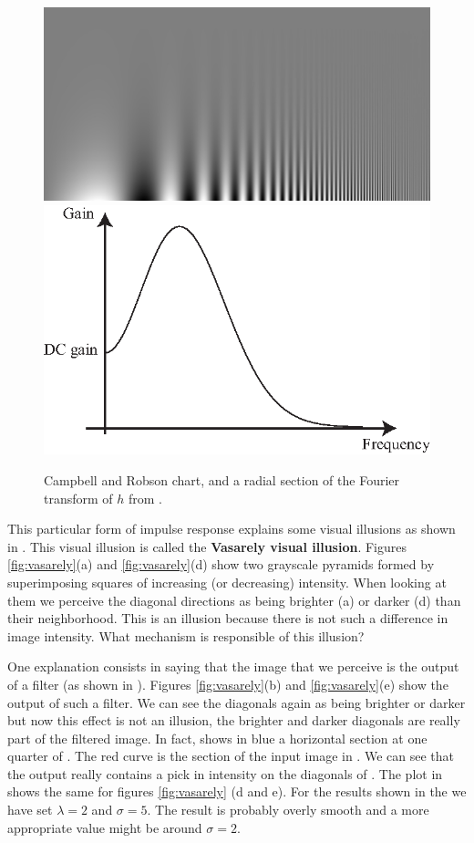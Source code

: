 \begin{figure}[h]
\centerline{
\includegraphics[trim=0cm 0cm 2cm 0cm, clip=true,width=.45\linewidth]{figures/spatial_filters/csf.jpg}
\includegraphics[width=.45\linewidth]{figures/derivatives/dft_radial_EVS.eps}
}
\caption{Campbell and Robson chart, and a radial section of the Fourier transform of $h$ from .}
\end{figure}

This particular form of impulse response explains some visual illusions as shown in \fig{\ref{fig:vasarely}}. This visual illusion is called the {\bf Vasarely visual illusion}.
Figures \ref{fig:vasarely}(a) and \ref{fig:vasarely}(d) show two grayscale pyramids  formed by superimposing squares of increasing (or decreasing) intensity. When looking at them we perceive the diagonal directions as being brighter (a) or darker (d) than their neighborhood. This is an illusion because there is not such a difference in image intensity. What mechanism is responsible of this illusion? 

One explanation consists in saying that the image that we perceive is the output of a filter (as shown in \eqn{\ref{eq:humanmodel}}). Figures \ref{fig:vasarely}(b) and \ref{fig:vasarely}(e) show the output of such a filter. We can see the diagonals again as being brighter or darker but now this effect is not an illusion, the brighter and darker diagonals are really part of the filtered image. In fact,  shows in blue a horizontal section at one quarter of . The red curve is the section of the input image in . We can see that the output really contains a pick in intensity on the diagonals of . The plot in  shows the same for figures \ref{fig:vasarely} (d and e). For the results shown in the \fig{\ref{fig:vasarely}} we have set $\lambda = 2$ and $\sigma = 5$. The result is probably overly smooth and a more appropriate value might be around $\sigma =2$. 

